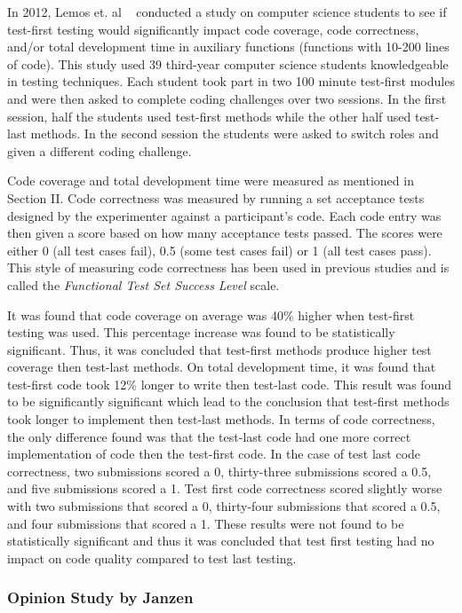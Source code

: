 \documentclass{sig-alternate}
\begin{document}
In 2012, Lemos et. al ~\cite{Lemos:2012} conducted a study on computer science students to see if test-first testing would significantly impact code coverage,  code correctness, and/or total development time in auxiliary functions (functions with 10-200 lines of code).   This study used 39 third-year computer science students knowledgeable in testing techniques. Each student took part in  two 100 minute test-first modules and were then asked to complete coding challenges over two sessions.  In the first session, half the students used test-first methods while the other half used test-last methods.  In the second session the students were asked to switch roles and given a different coding challenge.

Code coverage and total development time were measured as mentioned in Section II.  Code correctness was measured by running a set acceptance tests designed by the experimenter against a participant's code. Each code entry was then given a score based on how many acceptance tests passed.  The scores were either 0 (all test cases fail), 0.5 (some test cases fail) or 1 (all test cases pass).  This style of measuring code correctness has been used in previous studies and is called the \textit{Functional Test Set Success Level} scale.

It was found that code coverage on average was 40\% higher when test-first testing was used.  This percentage increase was found to be statistically significant. Thus, it was concluded that test-first methods produce higher test coverage then test-last methods. On total development time, it was found that test-first code took 12\% longer to write then test-last code.  This result was found to be significantly significant which lead to the conclusion that test-first methods took longer to implement then test-last methods. In terms of code correctness, the only difference found was that the test-last code had one more correct implementation of code then the test-first code.  In the case of test last code correctness, two submissions scored a 0, thirty-three submissions scored a 0.5, and five submissions scored a 1.  Test first code correctness scored slightly worse with two submissions that scored a 0, thirty-four submissions that scored a 0.5, and four submissions that scored a 1.  These results were not found to be statistically significant and thus it was concluded that test first testing had no impact on code quality compared to test last testing.
 
\subsubsection{Opinion Study by Janzen}
\end{document}
